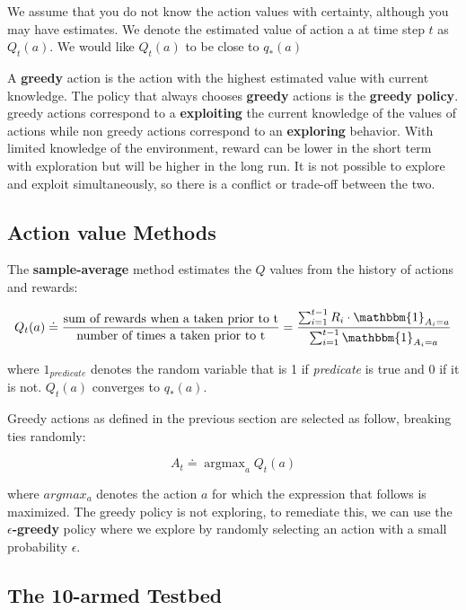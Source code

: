 \documentclass[11pt]{article}
\DeclareMathOperator*{\argmax}{argmax}
\begin{document}
We assume that you do not know the action values with certainty, although you
may have estimates. We denote the estimated value of action a at time step \(t\)
as \(Q_{t}(a)\). We would like \(Q_{t}(a)\) to be close to \(q_{*}(a)\)

A \textbf{greedy} action is the action with the highest estimated value with current
knowledge. The policy that always chooses \textbf{greedy} actions is the \textbf{greedy
policy}. greedy actions correspond to a \textbf{exploiting} the current knowledge of
the values of actions while non greedy actions correspond to an \textbf{exploring}
behavior. With limited knowledge of the environment, reward can be lower in the
short term with exploration but will be higher in the long run. It is not
possible to explore and exploit simultaneously, so there is a conflict or
trade-off between the two.

\subsection{Action value Methods}
\label{sec:orgcf3d499}

The \textbf{sample-average} method estimates the \(Q\) values from the history of actions
and rewards:

\begin{equation}
Q_{t}(a) \doteq \frac{\mbox{sum of rewards when a taken prior to t}}{\mbox{number of times a taken prior to t}} = \frac{\sum_{i=1}^{t-1} R_i \cdot \mathbbm{1}_{A_i = a}}{\sum_{i=1}^{t-1} \mathbbm{1}_{A_i = a}}
\end{equation}

where \(1_{predicate}\) denotes the random variable that is 1 if \emph{predicate} is
true and 0 if it is not. \(Q_t(a)\) converges to \(q_*(a)\).

Greedy actions as defined in the previous section are selected as follow,
breaking ties randomly:

\begin{equation}
A_t \doteq \argmax_{a} Q_t(a)
\end{equation}

where \(argmax_{a}\) denotes the action \(a\) for which the expression that follows
is maximized. The greedy policy is not exploring, to remediate this, we can use
the \textbf{\(\epsilon\)-greedy} policy where we explore by randomly selecting an action
with a small probability \(\epsilon\).

\subsection{The 10-armed Testbed}
\label{sec:org7bf1798}
\end{document}
